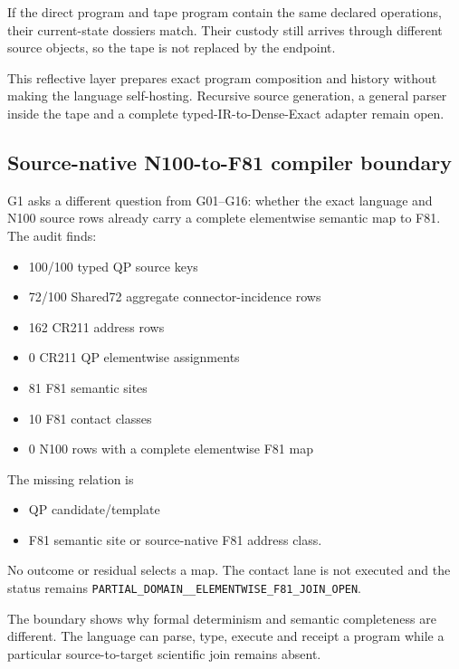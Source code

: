 If the direct program and tape program contain the same declared
operations, their current-state dossiers match. Their custody still
arrives through different source objects, so the tape is not replaced by
the endpoint.

This reflective layer prepares exact program composition and history
without making the language self-hosting. Recursive source generation, a
general parser inside the tape and a complete typed-IR-to-Dense-Exact
adapter remain open.

\subsection{Source-native N100-to-F81 compiler
boundary}\label{viii-ch02-source-native-n100-to-f81-compiler-boundary}

G1 asks a different question from G01--G16: whether the exact language
and N100 source rows already carry a complete elementwise semantic map
to F81. The audit finds:

\begin{itemize}
\tightlist
\item
  100/100 typed QP source keys
\item
  72/100 Shared72 aggregate connector-incidence rows
\item
  162 CR211 address rows
\item
  0 CR211 QP elementwise assignments
\item
  81 F81 semantic sites
\item
  10 F81 contact classes
\item
  0 N100 rows with a complete elementwise F81 map
\end{itemize}

The missing relation is

\begin{itemize}
\tightlist
\item
  QP candidate/template
\item
  F81 semantic site or source-native F81 address class.
\end{itemize}

No outcome or residual selects a map. The contact lane is not executed
and the status remains
\nolinkurl{PARTIAL_DOMAIN__ELEMENTWISE_F81_JOIN_OPEN}.

The boundary shows why formal determinism and semantic completeness are
different. The language can parse, type, execute and receipt a program
while a particular source-to-target scientific join remains absent.

